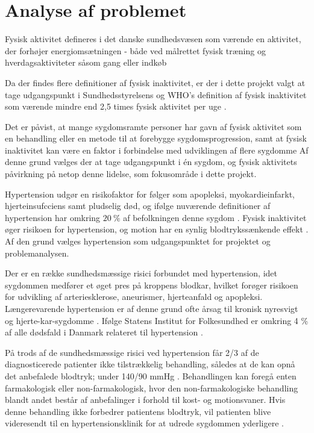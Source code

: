 \section{Analyse af problemet}
Fysisk aktivitet defineres i det danske sundhedsvæsen som værende en aktivitet, der forhøjer energiomsætningen - både ved målrettet fysisk træning og hverdagsaktiviteter såsom gang eller indkøb \citep{motionsraad2007, terkelsen2015}

Da der findes flere definitioner af fysisk inaktivitet, er der i dette projekt valgt at tage udgangspunkt i Sundhedsstyrelsens og WHO's definition af fysisk inaktivitet som værende mindre end 2,5 times fysisk aktivitet per uge \citep{motionsraad2007}. 

Det er påvist, at mange sygdomsramte personer har gavn af fysisk aktivitet som en behandling eller en metode til at forebygge sygdomsprogression, samt at fysisk inaktivitet kan være en faktor i forbindelse med udviklingen af flere sygdomme \citep{motionsraad2007,pedersen2011}
Af denne grund vælges der at tage udgangspunkt i én sygdom, og fysisk aktivitets påvirkning på netop denne lidelse, som fokusområde i dette projekt.

Hypertension udgør en risikofaktor for følger som apopleksi, myokardieinfarkt, hjerteinsufcciens samt pludselig død, og ifølge nuværende definitioner af hypertension har omkring $20~\%$ af befolkningen denne sygdom \citep{pedersen2011}. Fysisk inaktivitet øger risikoen for hypertension, og motion har en synlig blodtrykssænkende effekt \citep{olsen2015}. Af den grund vælges hypertension som udgangspunktet for projektet og problemanalysen. 

Der er en række sundhedsmæssige risici forbundet med hypertension, idet sygdommen medfører et øget pres på kroppens blodkar, hvilket forøger risikoen for udvikling af arteriesklerose, aneurismer, hjerteanfald og apopleksi. Længerevarende hypertension er af denne grund ofte årsag til kronisk nyresvigt og hjerte-kar-sygdomme \citep{martini2015}. Ifølge Statens Institut for Folkesundhed er omkring 4 \% af alle dødsfald i Danmark relateret til hypertension \citep{juel2006}.

På trods af de sundhedsmæssige risici ved hypertension får 2/3 af de diagnosticerede patienter ikke tilstrækkelig behandling, således at de kan opnå det anbefalede blodtryk; under 140/90 mmHg \citep{martini2015, paulsen2012}. Behandlingen kan foregå enten farmakologisk eller non-farmakologisk, hvor den non-farmakologiske behandling blandt andet består af anbefalinger i forhold til kost- og motionsvaner. Hvis denne behandling ikke forbedrer patientens blodtryk, vil patienten blive videresendt til en hypertensionsklinik for at udrede sygdommen yderligere \cite{lodberg2016, bech2015}.

